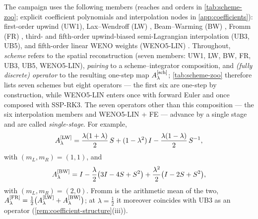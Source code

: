 \documentclass[pdflatex,sn-mathphys-num]{sn-jnl}%
\theoremstyle{thmstyleone}%
\theoremstyle{thmstyletwo}%
\theoremstyle{thmstylethree}%
\newcommand{\Asch}{A^{[\rm sch]}_\lambda}
\begin{document}
The campaign uses the following members (reaches and orders in \cref{tab:scheme-zoo}; explicit coefficient polynomials and interpolation nodes in \cref{app:coefficients}): first-order upwind (UW1), Lax--Wendroff (LW) \cite{LaxWendroff1960}, Beam--Warming (BW) \cite{WarmingBeam1976}, Fromm (FR) \cite{Fromm1968}, third- and fifth-order upwind-biased semi-Lagrangian interpolation (UB3, UB5), and fifth-order linear WENO weights (WENO5-LIN) \cite{Shu1998}.
Throughout, \emph{scheme} refers to the spatial reconstruction (seven members: UW1, LW, BW, FR, UB3, UB5, WENO5-LIN), \emph{pairing} to a scheme--integrator composition, and \emph{(fully discrete) operator} to the resulting one-step map $\Asch$; \cref{tab:scheme-zoo} therefore lists seven schemes but eight operators --- the first six are one-step by construction, while WENO5-LIN enters once with forward Euler and once composed with SSP-RK3.
The seven operators other than this composition --- the six interpolation members and WENO5-LIN + FE --- advance by a single stage and are called \emph{single-stage}.
For example, \[ A^{[\rm LW]}_\lambda = \frac{\lambda(1+\lambda)}{2}\,S +(1-\lambda^2)\,I -\frac{\lambda(1-\lambda)}{2}\,S^{-1}, \] with $(m_L,m_R)=(1,1)$, and \[ A^{[\rm BW]}_\lambda = I-\frac{\lambda}{2}\bigl(3I-4S+S^{2}\bigr) +\frac{\lambda^{2}}{2}\bigl(I-2S+S^{2}\bigr), \] with $(m_L,m_R)=(2,0)$.
Fromm is the arithmetic mean of the two, $A^{[\rm FR]}_\lambda=\tfrac12\bigl(A^{[\rm LW]}_\lambda +A^{[\rm BW]}_\lambda\bigr)$; at $\lambda=\tfrac12$ it moreover coincides with UB3 as an operator (\cref{rem:coefficient-structure}(iii)).
\end{document}
